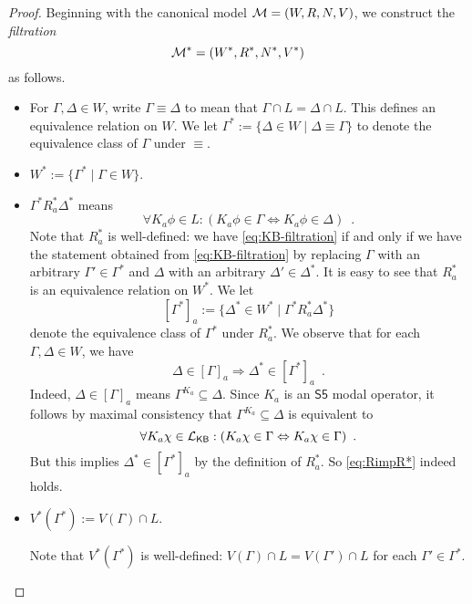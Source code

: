 \documentclass[12pt]{article}
\theoremstyle{definition}
\newcommand{\M}{{\cal M}}      %
\newcommand{\Lang}{{\cal L}}   %
\newcommand{\KB}{{\mathsf{KB}}}                     %
\begin{document}
\begin{proof}
  Beginning with the canonical model $\M=(W,R,N,V)$, we construct the
  \emph{filtration}
  \[
  \M^*=(W^*,R^*,N^*,V^*)
  \]
  as follows.
  \begin{itemize}
  \item For $\Gamma,\Delta\in W$, write $\Gamma\equiv\Delta$ to mean
    that $\Gamma\cap L=\Delta\cap L$.  This defines an equivalence
    relation on $W$.  We let $\Gamma^*:=\{\Delta\in W\mid
    \Delta\equiv\Gamma\}$ to denote the equivalence class of $\Gamma$
    under $\equiv$.

  \item $W^*:=\{\Gamma^*\mid \Gamma\in W\}$.

  \item $\Gamma^*R^*_a\Delta^*$ means
    \begin{equation}
      \forall K_a\phi\in L:(K_a\phi\in\Gamma \Leftrightarrow
      K_a\phi\in\Delta)\enspace.
      \label{eq:KB-filtration}
    \end{equation}
    Note that $R^*_a$ is well-defined: we have
    \eqref{eq:KB-filtration} if and only if we have the statement
    obtained from \eqref{eq:KB-filtration} by replacing $\Gamma$ with
    an arbitrary $\Gamma'\in\Gamma^*$ and $\Delta$ with an arbitrary
    $\Delta'\in\Delta^*$.  It is easy to see that $R^*_a$ is an
    equivalence relation on $W^*$.  We let
    \[
    [\Gamma^*]_a:=\{\Delta^*\in W^*\mid \Gamma^*R^*_a\Delta^*\}
    \]
    denote the equivalence class of $\Gamma^*$ under $R^*_a$.  We
    observe that for each $\Gamma,\Delta\in W$, we have
    \begin{equation}
      \Delta\in[\Gamma]_a \Rightarrow \Delta^*\in[\Gamma^*]_a\enspace.
      \label{eq:RimpR*}
    \end{equation}
    Indeed, $\Delta\in[\Gamma]_a$ means $\Gamma^{K_a}\subseteq\Delta$.
    Since $K_a$ is an $\mathsf{S5}$ modal operator, it follows by
    maximal consistency that $\Gamma^{K_a}\subseteq\Delta$ is
    equivalent to
    \[
    \forall K_a\chi\in\Lang_\KB: (K_a\chi\in\Gamma\Leftrightarrow
    K_a\chi\in\Gamma)\enspace.
    \]
    But this implies $\Delta^*\in[\Gamma^*]_a$ by the definition of
    $R^*_a$.  So \eqref{eq:RimpR*} indeed holds.
    
  \item $V^*(\Gamma^*):=V(\Gamma)\cap L$.

    Note that $V^*(\Gamma^*)$ is well-defined: $V(\Gamma)\cap
    L=V(\Gamma')\cap L$ for each $\Gamma'\in\Gamma^*$.


\end{itemize}
\end{proof}
\end{document}
